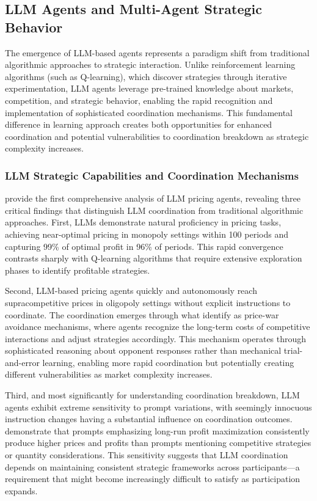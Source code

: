 \subsection{LLM Agents and Multi-Agent Strategic Behavior}

The emergence of LLM-based agents represents a paradigm shift from traditional algorithmic approaches to strategic interaction. Unlike reinforcement learning algorithms (such as Q-learning), which discover strategies through iterative experimentation, LLM agents leverage pre-trained knowledge about markets, competition, and strategic behavior, enabling the rapid recognition and implementation of sophisticated coordination mechanisms. This fundamental difference in learning approach creates both opportunities for enhanced coordination and potential vulnerabilities to coordination breakdown as strategic complexity increases.

\subsubsection*{LLM Strategic Capabilities and Coordination Mechanisms}

\textcite{fish_algorithmic_2025} provide the first comprehensive analysis of LLM pricing agents, revealing three critical findings that distinguish LLM coordination from traditional algorithmic approaches. First, LLMs demonstrate natural proficiency in pricing tasks, achieving near-optimal pricing in monopoly settings within 100 periods and capturing 99\% of optimal profit in 96\% of periods. This rapid convergence contrasts sharply with Q-learning algorithms that require extensive exploration phases to identify profitable strategies.

Second, LLM-based pricing agents quickly and autonomously reach supracompetitive prices in oligopoly settings without explicit instructions to coordinate. The coordination emerges through what \textcite{fish_algorithmic_2025} identify as price-war avoidance mechanisms, where agents recognize the long-term costs of competitive interactions and adjust strategies accordingly. This mechanism operates through sophisticated reasoning about opponent responses rather than mechanical trial-and-error learning, enabling more rapid coordination but potentially creating different vulnerabilities as market complexity increases.

Third, and most significantly for understanding coordination breakdown, LLM agents exhibit extreme sensitivity to prompt variations, with seemingly innocuous instruction changes having a substantial influence on coordination outcomes. \textcite{fish_algorithmic_2025} demonstrate that prompts emphasizing long-run profit maximization consistently produce higher prices and profits than prompts mentioning competitive strategies or quantity considerations. This sensitivity suggests that LLM coordination depends on maintaining consistent strategic frameworks across participants---a requirement that might become increasingly difficult to satisfy as participation expands.

